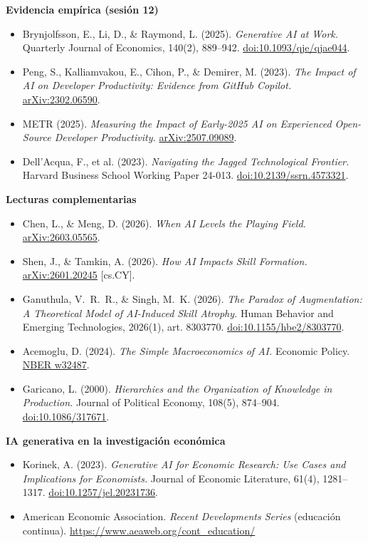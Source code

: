 \documentclass[11pt]{article}
\begin{document}
\textbf{Evidencia emp\'irica (sesi\'on 12)}
\begin{itemize}
\item Brynjolfsson, E., Li, D., \& Raymond, L. (2025). \emph{Generative AI at Work.} Quarterly Journal of Economics, 140(2), 889--942. \href{https://doi.org/10.1093/qje/qjae044}{doi:10.1093/qje/qjae044}.
\item Peng, S., Kalliamvakou, E., Cihon, P., \& Demirer, M. (2023). \emph{The Impact of AI on Developer Productivity: Evidence from GitHub Copilot.} \href{https://arxiv.org/abs/2302.06590}{arXiv:2302.06590}.
\item METR (2025). \emph{Measuring the Impact of Early-2025 AI on Experienced Open-Source Developer Productivity.} \href{https://arxiv.org/abs/2507.09089}{arXiv:2507.09089}.
\item Dell'Acqua, F., et al. (2023). \emph{Navigating the Jagged Technological Frontier.} Harvard Business School Working Paper 24-013. \href{https://doi.org/10.2139/ssrn.4573321}{doi:10.2139/ssrn.4573321}.
\end{itemize}

\textbf{Lecturas complementarias}
\begin{itemize}
\item Chen, L., \& Meng, D. (2026). \emph{When AI Levels the Playing Field.} \href{https://arxiv.org/abs/2603.05565}{arXiv:2603.05565}.
\item Shen, J., \& Tamkin, A. (2026). \emph{How AI Impacts Skill Formation.} \href{https://arxiv.org/abs/2601.20245}{arXiv:2601.20245} [cs.CY].
\item Ganuthula, V.~R.~R., \& Singh, M.~K. (2026). \emph{The Paradox of Augmentation: A Theoretical Model of AI-Induced Skill Atrophy.} Human Behavior and Emerging Technologies, 2026(1), art. 8303770. \href{https://doi.org/10.1155/hbe2/8303770}{doi:10.1155/hbe2/8303770}.
\item Acemoglu, D. (2024). \emph{The Simple Macroeconomics of AI.} Economic Policy. \href{https://www.nber.org/papers/w32487}{NBER w32487}.
\item Garicano, L. (2000). \emph{Hierarchies and the Organization of Knowledge in Production.} Journal of Political Economy, 108(5), 874--904. \href{https://doi.org/10.1086/317671}{doi:10.1086/317671}.
\end{itemize}

\textbf{IA generativa en la investigaci\'on econ\'omica}
\begin{itemize}
\item Korinek, A. (2023). \emph{Generative AI for Economic Research: Use Cases and Implications for Economists.} Journal of Economic Literature, 61(4), 1281--1317. \href{https://doi.org/10.1257/jel.20231736}{doi:10.1257/jel.20231736}.
\item American Economic Association. \emph{Recent Developments Series} (educaci\'on continua). \url{https://www.aeaweb.org/cont_education/}
\end{itemize}
\end{document}
